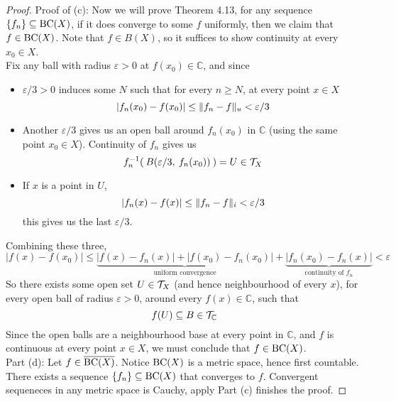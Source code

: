 \documentclass[../../main.tex]{subfiles}
\begin{document}
\begin{proof}
    Proof of (c): Now we will prove Theorem 4.13, for any sequence $\{f_n\}\subseteq \operatorname{BC}({X})$, if it does converge to some $f$ uniformly, then we claim that $f\in \operatorname{BC}({X})$. Note that $f\in B(X)$, so it suffices to show continuity at every $x_0\in X$.\\
    
    Fix any ball with radius $\varepsilon>0$ at $f(x_0)\in\mathbb{C}$, and since
    \begin{itemize}
        \item $\varepsilon/3>0$ induces some $N$ such that for every $n\geq N$, at every point $x\in X$
        \[
        |f_n(x_0)-f(x_0)|\leq\lVert {f_n-f} \rVert_u<\varepsilon/3
        \]
        \item Another $\varepsilon/3$ gives us an open ball around $f_n(x_0)$ in $\mathbb{C}$ (using the same point $x_0\in X$). Continuity of $f_n$ gives us
        \[
        f_n^{-1}(\:B(\varepsilon/3,\: f_n(x_0))\:) = U\in\mathcal{T}_X
        \]
        \item If $x$ is a point in $U$,
        \[
            |f_n(x)-f(x)|\leq \lVert {f_n-f} \rVert_i<\varepsilon/3
        \]
        this gives us the last $\varepsilon/3$.
    \end{itemize}
    Combining these three, 
    \[
    |f(x)-f(x_0)|\leq \underbrace{|f(x)-f_n(x)|+|f(x_0)-f_n(x_0)|}_{\text{uniform convergence}}+\underbrace{|f_n(x_0)-f_n(x)|}_{\text{continuity of }f_n}< \varepsilon
    \]
    So there exists some open set $U\in\mathcal{T}_X$ (and hence neighbourhood of every $x$), for every open ball of radius $\varepsilon>0$, around every $f(x)\in \mathbb{C}$, such that
    \[
    f(U)\subseteq B\in \mathcal{T}_\mathbb{C}
    \]
    Since the open balls are a neighbourhood base at every point in $\mathbb{C}$, and $f$ is continuous at every point $x\in X$, we must conclude that $f\in\operatorname{BC}({X})$.\\

    Part (d): Let $f\in \overline{\operatorname{BC}({X})}$. Notice $\operatorname{BC}({X})$ is a metric space, hence first countable. There exists a sequence $\{f_n\}\subseteq \operatorname{BC}({X})$ that converges to $f$. Convergent sequeneces in any metric space is Cauchy, apply Part (c) finishes the proof.
\end{proof}
\end{document}
